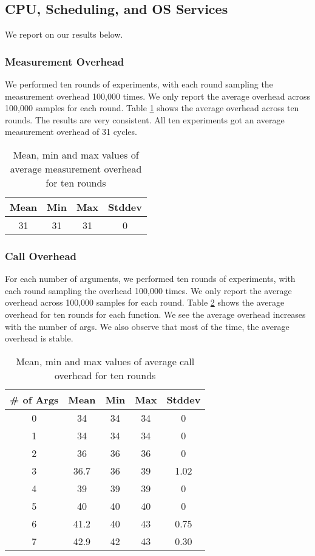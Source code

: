 \subsection{CPU, Scheduling, and OS Services}
We report on our results below.
\subsubsection{Measurement Overhead}
We performed ten rounds of experiments, with each round sampling the measurement overhead 100,000 times. We only report the average overhead across 100,000 samples for each round.
Table \ref{tab:t1} shows the average overhead across ten rounds. 
The results are very consistent.
All ten experiments got an average measurement overhead of 31 cycles.

\begin{table}[htb]

\caption{Mean, min and max values of average measurement overhead for ten rounds}

    \begin{tabular}{|c|c|c|c|} 
     \hline
     Mean & Min & Max & Stddev\\ 
     \hline
     31 & 31 & 31 & 0\\ 
     \hline
    \end{tabular}
    \label{tab:t1}
\end{table}

\subsubsection{Call Overhead}
For each number of arguments, we performed ten rounds of experiments,
with each round sampling the overhead 100,000 times.
%
We only report the average overhead across 100,000 samples for each
round.
%
Table \ref{tab:t2} shows the average overhead for ten rounds for each
function.
%
We see the average overhead increases with the number of args. We also
observe that most of the time, the average overhead is stable.

\begin{table}[htb]

\caption{Mean, min and max values of average call overhead for ten rounds}

    \begin{tabular}{|c|c|c|c|c|} 
     \hline
     \# of Args & Mean & Min & Max & Stddev \\ 
     \hline
     0 & 34 & 34 & 34 & 0 \\ 
     \hline
     1 & 34 & 34 & 34 & 0\\ 
     \hline
     2 & 36 & 36 & 36 & 0\\ 
     \hline
     3 & 36.7 & 36 & 39 & 1.02\\ 
     \hline
     4 & 39 & 39 & 39 & 0\\ 
     \hline
     5 & 40 & 40 & 40 & 0\\ 
     \hline
     6 & 41.2 & 40 & 43 & 0.75 \\ 
     \hline
     7 & 42.9 & 42 & 43 & 0.30\\ 
     \hline
    \end{tabular}
    \label{tab:t2}
\end{table}


